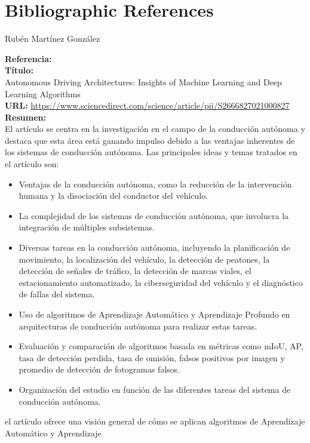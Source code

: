 \documentclass[10pt,letterpaper,final]{article}
\begin{document}
    \section*{Bibliographic References}
    Rubén Martínez González
    \newline
    \begin{longtable}
        \hline
        \noindent \textbf{Referencia:}~\cite{alam2022cost} \\
        \textbf{Título:} \\
        Autonomous Driving Architectures: Insights of Machine Learning and Deep Learning Algorithms \\
        \textbf{URL:}
        \url{https://www.sciencedirect.com/science/article/pii/S2666827021000827}
        \textbf{Resumen:} \\
        El artículo se centra en la investigación en el campo de la conducción autónoma y destaca que esta área está ganando
        impulso debido a las ventajas inherentes de los sistemas de conducción autónoma. Las principales ideas y temas tratados en el artículo son:
        \begin{itemize}
            \item Ventajas de la conducción autónoma, como la reducción de la intervención humana y la disociación del conductor del vehículo.
            \item La complejidad de los sistemas de conducción autónoma, que involucra la integración de múltiples subsistemas.
            \item Diversas tareas en la conducción autónoma, incluyendo la planificación de movimiento, la localización del vehículo,
            la detección de peatones, la detección de señales de tráfico, la detección de marcas viales, el estacionamiento automatizado,
            la ciberseguridad del vehículo y el diagnóstico de fallas del sistema.
            \item Uso de algoritmos de Aprendizaje Automático y Aprendizaje Profundo en arquitecturas de conducción autónoma para realizar estas tareas.
            \item Evaluación y comparación de algoritmos basada en métricas como mIoU, AP, tasa de detección perdida, tasa de omisión,
            falsos positivos por imagen y promedio de detección de fotogramas falsos.
            \item Organización del estudio en función de las diferentes tareas del sistema de conducción autónoma.
        \end{itemize}
        el artículo ofrece una visión general de cómo se aplican algoritmos de Aprendizaje Automático y Aprendizaje

\end{longtable}
\end{document}

